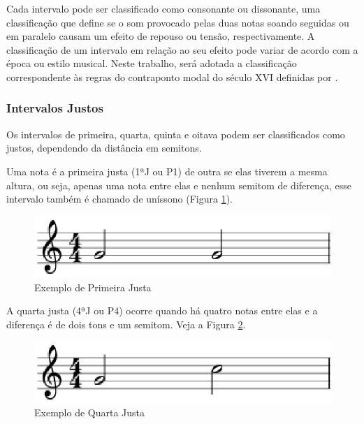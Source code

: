       Cada intervalo pode ser classificado como consonante ou dissonante, uma classificação que define se o som provocado pelas duas notas soando seguidas ou em paralelo causam um efeito de repouso ou tensão, respectivamente. A classificação de um intervalo em relação ao seu efeito pode variar de acordo com a época ou estilo musical. Neste trabalho, será adotada a classificação correspondente às regras do contraponto modal do século XVI definidas por .

      \subsubsection[Intervalos Justos]{Intervalos Justos}

        Os intervalos de primeira, quarta, quinta e oitava podem ser classificados como justos, dependendo da distância em semitons.

        Uma nota é a primeira justa (1ªJ ou P1\footnotemark {}) de outra se elas tiverem a mesma altura, ou seja, apenas uma nota entre elas e nenhum semitom de diferença, esse intervalo também é chamado de uníssono (Figura \ref{primeirajusta}).

        \begin{figure}[htb]
          \centering
          \includegraphics[scale=0.6]{figuras/primeirajusta.eps}
          \caption{Exemplo de Primeira Justa}
          \label{primeirajusta}
        \end{figure}


        A quarta justa (4ªJ ou P4) ocorre quando há quatro notas entre elas e a diferença é de dois tons e um semitom. Veja a Figura \ref{quartajusta}.

        \begin{figure}[htb]
          \centering
          \includegraphics[scale=0.6]{figuras/quartajusta.eps}
          \caption{Exemplo de Quarta Justa}
          \label{quartajusta}
        \end{figure}

